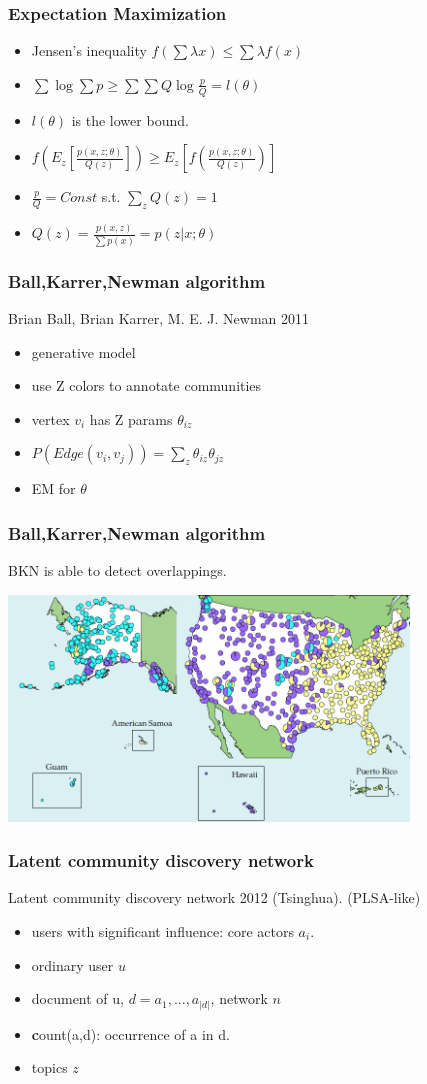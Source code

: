 \documentclass[professionalfonts]{beamer}
\begin{document}
\begin{frame}
\frametitle{Expectation Maximization}
\begin{itemize}
\item Jensen's inequality $f(\sum \lambda x) \leq \sum \lambda f(x)$
\item $\sum \log \sum p \geq \sum \sum Q \log \frac{p}{Q}=l(\theta) $
\item $l(\theta)$ is the lower bound. 
\item $f(E_z[\frac{p(x,z;\theta)}{Q(z)}]) \geq E_z[f(\frac{p(x,z;\theta)}{Q(z)})]$
\item $\frac{p}{Q}=Const$ s.t. $\sum_z Q(z)=1$
\item $Q(z)=\frac{p(x,z)}{\sum p(x)}=p(z|x;\theta)$
\end{itemize}
\end{frame}

\begin{frame}
\frametitle{Ball,Karrer,Newman algorithm}
Brian Ball, Brian Karrer, M. E. J. Newman 2011
\begin{itemize}
\item generative model
\item use Z colors to annotate communities
\item vertex $v_i$ has Z params $\theta_{iz}$
\item $P(Edge(v_i,v_j)) = \sum_{z} \theta_{iz} \theta_{jz}$
\item EM for $\theta$
\end{itemize}
\end{frame}

\begin{frame}
\frametitle{Ball,Karrer,Newman algorithm}
BKN is able to detect overlappings.

\includegraphics[height=6cm]{bkn}
\end{frame}


\begin{frame}
\frametitle{Latent community discovery network}
Latent community discovery network 2012 (Tsinghua). (PLSA-like)
\begin{itemize}
\item users with significant influence: core actors $a_i$.
\item ordinary user $u$
\item document of u, $d=a_1,...,a_{|d|}$, network $n$ 
\item \textbf{c}ount(a,d): occurrence of a in d.
\item topics $z$
\end{itemize}
\end{frame}
\end{document}

